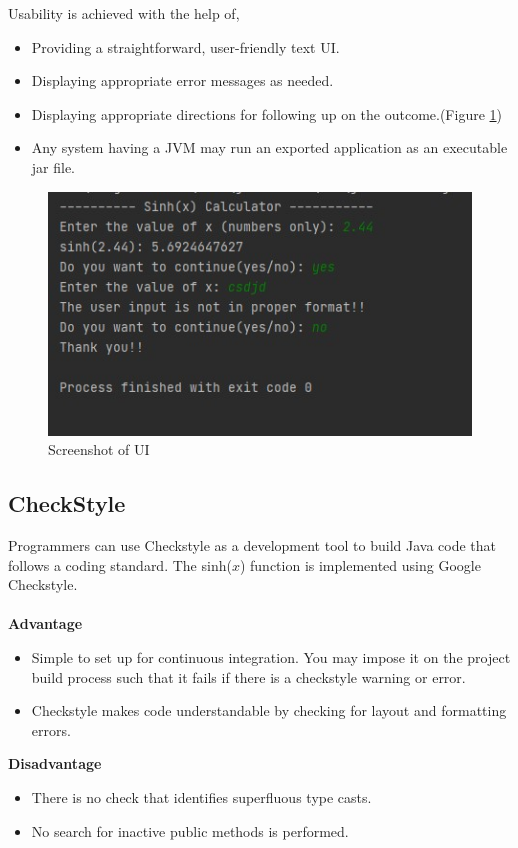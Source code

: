 \documentclass[
	12pt
]{article}
\begin{document}
\begin{enumerate}
\newline Usability is achieved with the help of,
\begin{itemize}
    \item Providing a straightforward, user-friendly text UI.
    \item Displaying appropriate error messages as needed.
    \item Displaying appropriate directions for following up on the outcome.(Figure \ref{Screenshot of  UI})
    \item Any system having a JVM may run an exported application as an executable jar file.
\end{itemize}
\begin{figure}[htp]
    \centering
    \includegraphics[width=12cm]{ui.jpg}
        \caption{Screenshot of  UI}
    \label{Screenshot of  UI}
\end{figure}
\end{enumerate}
\newpage
\subsection{CheckStyle}
Programmers can use Checkstyle as a development tool to build Java code that follows a coding standard\cite{checkstyle}. The sinh($x$) function is implemented using Google Checkstyle. \\ \\
\textbf{Advantage}
\begin{itemize}
    \item Simple to set up for continuous integration. You may impose it on the project build process such that it fails if there is a checkstyle warning or error.
    \item Checkstyle makes code understandable by checking for layout and formatting errors.
\end{itemize}
\textbf{Disadvantage}
\begin{itemize}
    \item There is no check that identifies superfluous type casts.
    \item No search for inactive public methods is performed.
\end{itemize}
\end{document}
